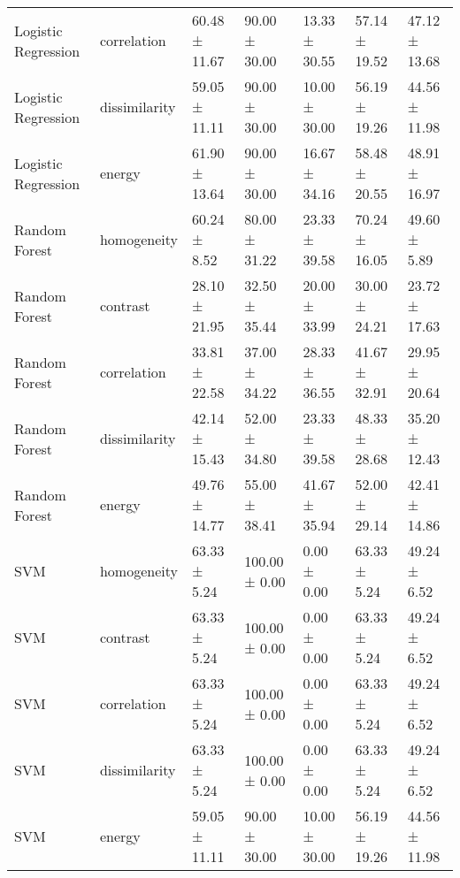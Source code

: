 \begin{tabular}{lllllll}
Logistic Regression & correlation & 60.48 ± 11.67 & 90.00 ± 30.00 & 13.33 ± 30.55 & 57.14 ± 19.52 & 47.12 ± 13.68 \\
Logistic Regression & dissimilarity & 59.05 ± 11.11 & 90.00 ± 30.00 & 10.00 ± 30.00 & 56.19 ± 19.26 & 44.56 ± 11.98 \\
Logistic Regression & energy & 61.90 ± 13.64 & 90.00 ± 30.00 & 16.67 ± 34.16 & 58.48 ± 20.55 & 48.91 ± 16.97 \\
Random Forest & homogeneity & 60.24 ± 8.52 & 80.00 ± 31.22 & 23.33 ± 39.58 & 70.24 ± 16.05 & 49.60 ± 5.89 \\
Random Forest & contrast & 28.10 ± 21.95 & 32.50 ± 35.44 & 20.00 ± 33.99 & 30.00 ± 24.21 & 23.72 ± 17.63 \\
Random Forest & correlation & 33.81 ± 22.58 & 37.00 ± 34.22 & 28.33 ± 36.55 & 41.67 ± 32.91 & 29.95 ± 20.64 \\
Random Forest & dissimilarity & 42.14 ± 15.43 & 52.00 ± 34.80 & 23.33 ± 39.58 & 48.33 ± 28.68 & 35.20 ± 12.43 \\
Random Forest & energy & 49.76 ± 14.77 & 55.00 ± 38.41 & 41.67 ± 35.94 & 52.00 ± 29.14 & 42.41 ± 14.86 \\
SVM & homogeneity & 63.33 ± 5.24 & 100.00 ± 0.00 & 0.00 ± 0.00 & 63.33 ± 5.24 & 49.24 ± 6.52 \\
SVM & contrast & 63.33 ± 5.24 & 100.00 ± 0.00 & 0.00 ± 0.00 & 63.33 ± 5.24 & 49.24 ± 6.52 \\
SVM & correlation & 63.33 ± 5.24 & 100.00 ± 0.00 & 0.00 ± 0.00 & 63.33 ± 5.24 & 49.24 ± 6.52 \\
SVM & dissimilarity & 63.33 ± 5.24 & 100.00 ± 0.00 & 0.00 ± 0.00 & 63.33 ± 5.24 & 49.24 ± 6.52 \\
SVM & energy & 59.05 ± 11.11 & 90.00 ± 30.00 & 10.00 ± 30.00 & 56.19 ± 19.26 & 44.56 ± 11.98 \\
\bottomrule
\end{tabular}
